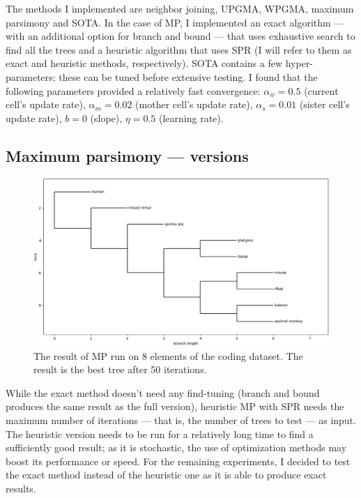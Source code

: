 \documentclass[11pt,twocolumn]{article}
\begin{document}
The methods I implemented are neighbor joining, UPGMA, WPGMA, maximum parsimony and SOTA. In the case of MP, I implemented an exact algorithm — with an additional option for branch and bound — that uses exhaustive search to find all the trees and a heuristic algorithm that uses SPR (I will refer to them as exact and heuristic methods, respectively). SOTA contains a few hyper-parameters; these can be tuned before extensive testing. I found that the following parameters provided a relatively fast convergence: $\alpha_w = 0.5$ (current cell's update rate), $\alpha_m = 0.02$ (mother cell's update rate), $\alpha_s = 0.01$ (sister cell's update rate), $b = 0$ (slope), $\eta = 0.5$ (learning rate).

\subsection{Maximum parsimony — versions}

\begin{figure}
    \centering
    \includegraphics[width=0.9\linewidth]{img/mp_9_taxa_heuristic.png}
    \caption{The result of MP run on 8 elements of the coding dataset. The result is the best tree after 50 iterations.}
    \label{fig:mp_8_taxa_heuristic}
\end{figure}

While the exact method doesn't need any find-tuning (branch and bound produces the same result as the full version), heuristic MP with SPR needs the maximum number of iterations — that is, the number of trees to test — as input. The heuristic version needs to be run for a relatively long time to find a sufficiently good result; as it is stochastic, the use of optimization methods may boost its performance or speed. For the remaining experiments, I decided to test the exact method instead of the heuristic one as it is able to produce exact results.
\end{document}
